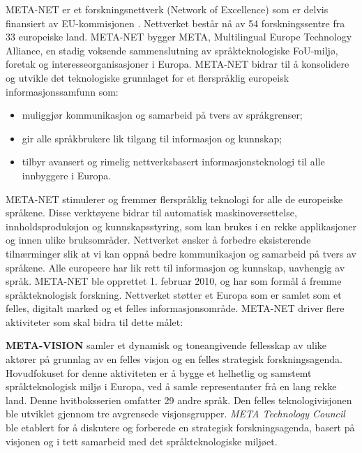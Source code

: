 \begin{multicols}{2}

META-NET er et forskningsnettverk (Network of Excellence) som er delvis finansiert av EU-kommisjonen \cite{rehm2011}. Nettverket består nå av 54 forskningssentre fra 33 europeiske land. META-NET bygger META, Multilingual Europe Technology Alliance, en stadig voksende sammenslutning av språkteknologiske FoU-miljø, foretak og interesseorganisasjoner i Europa.
META-NET bidrar til å konsolidere og utvikle det teknologiske grunnlaget for et flerspråklig europeisk informasjonssamfunn som:

\begin{itemize}
\item muliggjør kommunikasjon og samarbeid på tvers av språkgrenser;
\item gir alle språkbrukere lik tilgang til informasjon og kunnskap;
\item tilbyr avansert og rimelig nettverksbasert informasjonsteknologi til alle innbyggere i Europa.
\end{itemize}

META-NET stimulerer og fremmer flerspråklig teknologi for alle de europeiske språkene. Disse verktøyene bidrar til automatisk maskinoversettelse, innholdsproduksjon og kunnskapsstyring, som kan brukes i en rekke applikasjoner og innen ulike bruksområder. Nettverket ønsker å forbedre eksisterende tilnærminger slik at vi kan oppnå bedre kommunikasjon og samarbeid på tvers av språkene. Alle europeere har lik rett til informasjon og kunnskap, uavhengig av språk. META-NET ble opprettet 1. februar 2010, og har som formål å fremme språkteknologisk forskning. Nettverket støtter et Europa som er samlet som et felles, digitalt marked og et felles informasjonsområde. META-NET driver flere aktiviteter som skal bidra til dette målet:%

\textbf{META-VISION} samler et dynamisk og toneangivende fellesskap av ulike aktører på grunnlag av en felles visjon og en felles strategisk forskningsagenda. Hovudfokuset for denne aktiviteten er å bygge et helhetlig og samstemt språkteknologisk miljø i Europa, ved å samle representanter frå en lang rekke land. Denne hvitboksserien omfatter 29 andre språk. Den felles teknologivisjonen ble utviklet gjennom tre avgrensede visjonsgrupper. \textit{META Technology Council} ble etablert for å diskutere og forberede en strategisk forskningsagenda, basert på visjonen og i tett samarbeid med det språkteknologiske miljøet.


\end{multicols}
